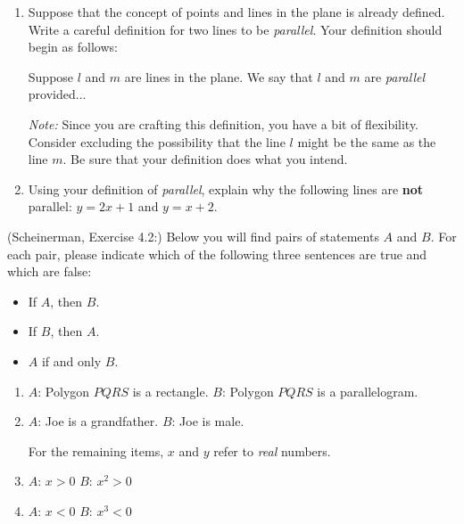 \documentclass{article}
\theoremstyle{definition}
\begin{document}
\begin{question}
    \begin{enumerate}
        \item 
        Suppose that the concept of points and lines
        in the plane is already defined.  Write a careful
        definition for two lines to be \emph{parallel}. 
        Your definition should begin as
        follows:
        \begin{center}
        Suppose $l$ and $m$ are lines in the plane. We say that $l$ and $m$ are \emph{parallel} provided...
        \end{center}

        {\emph{Note:} Since you are crafting this definition, you have a bit of flexibility.  Consider excluding the possibility that the line $l$ might be the same as the line $m$. Be sure that your definition does what you intend.}

        \item Using your definition of \emph{parallel}, explain why the following lines are \textbf{not} parallel: $y=2x+1$ and $y=x+2$.
    \end{enumerate}
\end{question}
\begin{solution}
\end{solution}


\begin{question}
   (Scheinerman, Exercise 4.2:)
    Below you will find pairs of statements $A$ and $B$. For each pair, please indicate which
of the following three sentences are true and which are false:
    \begin{itemize}
        \item If $A$, then $B$.
        \item If $B$, then $A$.
        \item $A$ if and only $B$.
    \end{itemize}
    \begin{enumerate}
        \item $A$: Polygon $PQRS$ is a rectangle. 
              $B$: Polygon $PQRS$ is a parallelogram.
        \item $A$: Joe is a grandfather.
              $B$: Joe is male.

         For the remaining items, $x$ and $y$ refer to \emph{real} numbers.

         \item $A$: $x>0$
               $B$: $x^2>0$
         \item $A$: $x<0$
               $B$: $x^3<0$
               
    \end{enumerate}
\end{question}
\begin{solution}
\end{solution}
\end{document}
